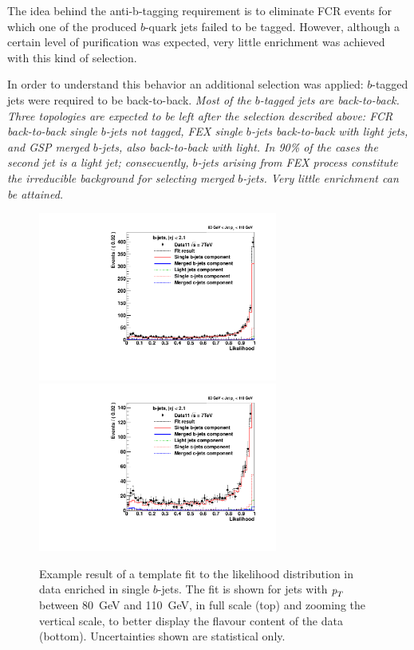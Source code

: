 The idea behind the anti-b-tagging requirement is to eliminate FCR events for which one of the produced $b$-quark jets failed to be tagged. However, although a certain level of purification was expected, very little enrichment was achieved with this kind of selection. 

In order to understand this behavior an additional selection was applied: $b$-tagged jets were required to be back-to-back.   %
\emph{Most of the $b$-tagged jets are back-to-back. Three topologies are expected to be left after the selection described above: FCR back-to-back single $b$-jets not tagged,  FEX single $b$-jets back-to-back with light jets, and GSP merged $b$-jets, also back-to-back with light.  In 90\% of the cases the second jet is a light jet; consecuently, $b$-jets arising from FEX process constitute the irreducible background for selecting merged $b$-jets. Very little enrichment can be attained.}

 
 







\begin{figure}[tp]
\centering
\includegraphics[width=0.7\textwidth]{FIGS/Fits/LikelihoodFit_3param_ETAFull_DataEnriched2btag_Bin2.pdf}
\includegraphics[width=0.7\textwidth]{FIGS/Fits/LikelihoodFit_3param_ETAFull_DataEnriched2btagZOOM_Bin2.pdf}
\caption{Example result of a template fit to the likelihood distribution in data enriched in single $b$-jets. The fit is shown for jets with ${\emph{p}_{T}}$ between  80~GeV and 110~GeV, in full scale (top) and zooming the vertical scale, to better display the flavour content of the data (bottom). Uncertainties shown are statistical only.}
\label{fig:fitenriched2btag1}
\end{figure}



